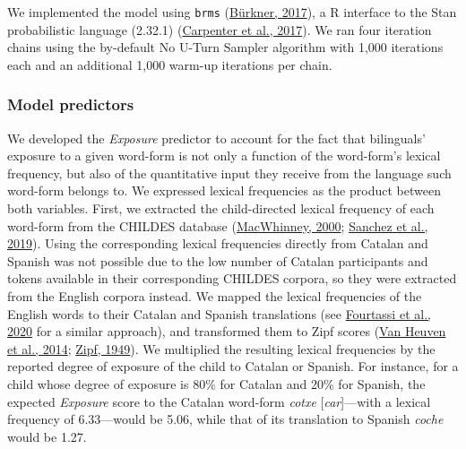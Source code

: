 \documentclass[
]{article}
\begin{document}
We implemented the model using \texttt{brms}
(\protect\hyperlink{ref-burkner2017brms}{Bürkner, 2017}), a R interface
to the Stan probabilistic language (2.32.1)
(\protect\hyperlink{ref-carpenter2017stan}{Carpenter et al., 2017}). We
ran four iteration chains using the by-default No U-Turn Sampler
algorithm with 1,000 iterations each and an additional 1,000 warm-up
iterations per chain.

\hypertarget{sec-predictors}{%
\subsubsection{Model predictors}\label{sec-predictors}}

We developed the \emph{Exposure} predictor to account for the fact that
bilinguals' exposure to a given word-form is not only a function of the
word-form's lexical frequency, but also of the quantitative input they
receive from the language such word-form belongs to. We expressed
lexical frequencies as the product between both variables. First, we
extracted the child-directed lexical frequency of each word-form from
the CHILDES database
(\protect\hyperlink{ref-macwhinney2000childes}{MacWhinney, 2000};
\protect\hyperlink{ref-sanchez2019childesdb}{Sanchez et al., 2019}).
Using the corresponding lexical frequencies directly from Catalan and
Spanish was not possible due to the low number of Catalan participants
and tokens available in their corresponding CHILDES corpora, so they
were extracted from the English corpora instead. We mapped the lexical
frequencies of the English words to their Catalan and Spanish
translations (see \protect\hyperlink{ref-fourtassi2020growth}{Fourtassi
et al., 2020} for a similar approach), and transformed them to Zipf
scores (\protect\hyperlink{ref-vanheuven2014subtlexuk}{Van Heuven et
al., 2014}; \protect\hyperlink{ref-zipf1949human}{Zipf, 1949}). We
multiplied the resulting lexical frequencies by the reported degree of
exposure of the child to Catalan or Spanish. For instance, for a child
whose degree of exposure is 80\% for Catalan and 20\% for Spanish, the
expected \emph{Exposure} score to the Catalan word-form \emph{cotxe}
{[}\emph{car}{]}---with a lexical frequency of 6.33---would be 5.06,
while that of its translation to Spanish \emph{coche} would be 1.27.
\end{document}
